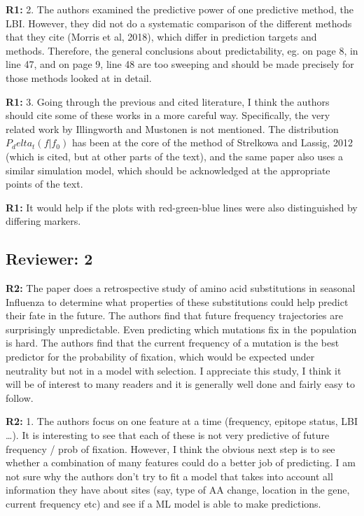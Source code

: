\documentclass[aps,rmp,onecolumn]{revtex4-1}
\newcommand{\refa}[1]{\textbf{R1:} #1\vskip 5mm}
\newcommand{\refb}[1]{\textbf{R2:} #1\vskip 5mm}
\begin{document}
\refa{2. The authors examined the predictive power of one predictive
method, the LBI. However, they did not do a systematic comparison of
the different methods that they cite (Morris et al, 2018), which differ in prediction
targets and methods. Therefore, the general conclusions about
predictability, eg. on page 8, in line 47, and on page 9, line 48 are
too sweeping and should be made precisely for those methods looked at
in detail.}

\refa{3. Going through the previous and cited literature, I think the authors should cite some of these works in a more careful way. Specifically, the very related work by Illingworth and Mustonen is not mentioned. The distribution $P_delta_t(f|f_0)$ has been at the core of
the method of Strelkowa and Lassig, 2012 (which is cited, but at other
parts of the text), and the same paper also uses a similar simulation model, which should be acknowledged at the appropriate points of the text.}

\refa{It would help if the plots with red-green-blue lines were also distinguished by differing markers.}


\subsection*{Reviewer: 2}

\refb{The paper does a retrospective study of amino acid substitutions in seasonal Influenza to determine what properties of these substitutions could help predict their fate in the future. The authors find that future frequency trajectories are surprisingly unpredictable. Even predicting which mutations fix in the population is hard. The authors find that the current frequency of a mutation is the best predictor for the probability of fixation, which would be expected under neutrality but not in a model with selection. 
I appreciate this study, I think it will be of interest to many readers and it is generally well done and fairly easy to follow. 
}

\refb{1. The authors focus on one feature at a time (frequency, epitope status, LBI …). It is interesting to see that each of these is not very predictive of future frequency / prob of fixation. However, I think the obvious next step is to see whether a combination of many features could do a better job of predicting. I am not sure why the authors don’t try to fit a model that takes into account all information they have about sites (say, type of AA change, location in the gene, current frequency etc) and see if a ML model is able to make predictions. }
\end{document}
